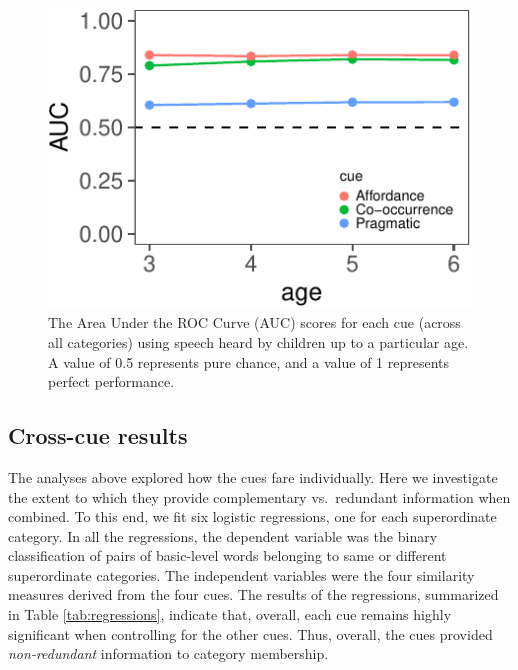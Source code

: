 \documentclass[english,,man]{apa6}
\begin{document}
\begin{figure}[!htbp]

{\centering \includegraphics{child_language_journal_files/figure-latex/dev-1} 

}

\caption{\label{fig:dev} The Area Under the ROC Curve (AUC) scores for each cue (across all categories) using speech heard by children up to a particular age. A value of 0.5 represents pure chance, and a value of 1 represents perfect performance.}\label{fig:dev}
\end{figure}

\hypertarget{cross-cue-results}{%
\subsection{Cross-cue results}\label{cross-cue-results}}

The analyses above explored how the cues fare individually. Here we investigate the extent to which they provide complementary vs.~redundant information when combined. To this end, we fit six logistic regressions, one for each superordinate category. In all the regressions, the dependent variable was the binary classification of pairs of basic-level words belonging to same or different superordinate categories. The independent variables were the four similarity measures derived from the four cues. The results of the regressions,
summarized in Table \ref{tab:regressions}, indicate that, overall, each cue remains highly significant when controlling for the other cues. Thus, overall, the cues provided \emph{non-redundant} information to category membership.
\end{document}
